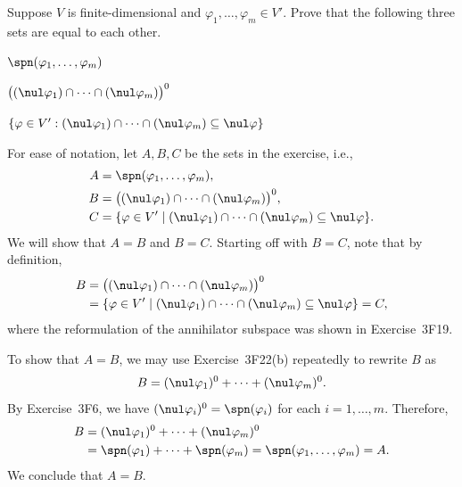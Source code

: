 \begin{exc}
\begin{exercise}
Suppose $V$ is finite-dimensional and $\varphi_1,\dots,\varphi_m\in V'$. Prove
that the following three sets are equal to each other.
\begin{parts}
\item $\spn(\varphi_1,\dots,\varphi_m)$
\item $\bigl((\nul\varphi_1)\cap\cdots\cap(\nul\varphi_m)\bigr)^0$
\item $\{\varphi\in V' : (\nul\varphi_1)\cap\cdots\cap(\nul\varphi_m)
  \subseteq\nul\varphi\}$
\end{parts}
\end{exercise}
\begin{solution}
For ease of notation, let $A,B,C$ be the sets in the exercise, i.e.,
\begin{align*}
A &= \spn(\varphi_1,\dots,\varphi_m),\\
B &= \bigl((\nul\varphi_1)\cap\cdots\cap(\nul\varphi_m)\bigr)^0,\\
C &= \{\varphi\in V' \mid (\nul\varphi_1)\cap\cdots\cap(\nul\varphi_m)
      \subseteq\nul\varphi\}.
\end{align*}
We will show that $A=B$ and $B=C$. Starting off with $B=C$, note that by
definition,
\begin{align*}
B &= \bigl((\nul\varphi_1)\cap\cdots\cap(\nul\varphi_m)\bigr)^0\\
  &= \{\varphi\in V' \mid (\nul\varphi_1)\cap\cdots\cap(\nul\varphi_m)
     \subseteq\nul\varphi\} = C,
\end{align*}
where the reformulation of the annihilator subspace was shown in
Exercise~3F19.

To show that $A=B$, we may use Exercise~3F22(b) repeatedly to rewrite $B$ as
\[ B = (\nul\varphi_1)^0+\cdots+(\nul\varphi_m)^0. \]
By Exercise~3F6, we have $(\nul\varphi_i)^0=\spn(\varphi_i)$ for each
$i=1,\dots,m$. Therefore,
\begin{align*}
B &= (\nul\varphi_1)^0+\cdots+(\nul\varphi_m)^0\\
  &= \spn(\varphi_1)+\cdots+\spn(\varphi_m) = \spn(\varphi_1,\dots,\varphi_m)
   = A.
\end{align*}
We conclude that $A=B$.
\end{solution}


\end{exc}
